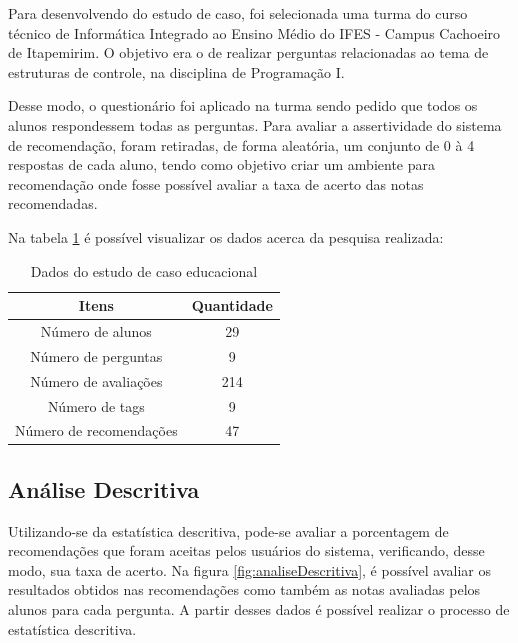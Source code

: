 Para desenvolvendo do estudo de caso, foi selecionada uma turma do curso técnico de Informática Integrado ao Ensino Médio do IFES - Campus Cachoeiro de Itapemirim. O objetivo era o de realizar perguntas relacionadas ao tema de estruturas de controle, na disciplina de Programação I.

Desse modo, o questionário foi aplicado na turma sendo pedido que todos os alunos respondessem todas as perguntas. Para avaliar a assertividade do sistema de recomendação, foram retiradas, de forma aleatória, um conjunto de 0 à 4 respostas de cada aluno, tendo como objetivo criar um ambiente para recomendação onde fosse possível avaliar a taxa de acerto das notas recomendadas.

Na tabela \ref{tableref:dadosEstudoCasoEducacional} é possível visualizar os dados acerca da pesquisa realizada:

\begin{table}[H]
\centering
\begin{tabular}{|c|c|}
\hline
\textbf{Itens}          & \textbf{Quantidade} \\ \hline
Número de alunos        & 29                  \\ \hline
Número de perguntas     & 9                   \\ \hline
Número de avaliações    & 214                 \\ \hline
Número de tags          & 9                   \\ \hline
Número de recomendações & 47                  \\ \hline
\end{tabular}
\caption{Dados do estudo de caso educacional}
\label{tableref:dadosEstudoCasoEducacional}
\end{table}

\subsection{Análise Descritiva}

Utilizando-se da estatística descritiva, pode-se avaliar a porcentagem de recomendações que foram aceitas pelos usuários do sistema, verificando, desse modo, sua taxa de acerto. Na figura \ref{fig:analiseDescritiva}, é possível avaliar os resultados obtidos nas recomendações como também as notas avaliadas pelos alunos para cada pergunta. A partir desses dados é possível realizar o processo de estatística descritiva.

